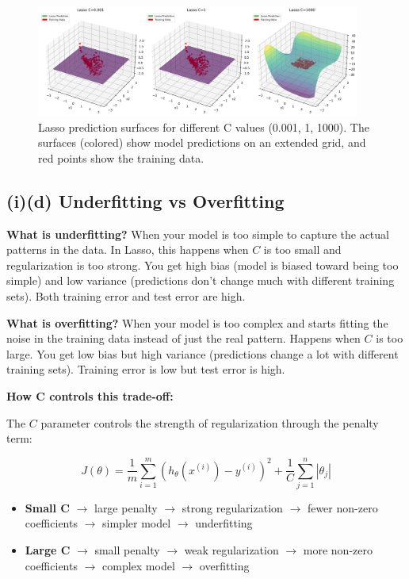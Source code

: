 \documentclass[11pt,a4paper]{article}
\begin{document}
\begin{figure}[H]
\centering
\includegraphics[width=0.95\textwidth]{figures/03_lasso_prediction_surfaces.png}
\caption{Lasso prediction surfaces for different C values (0.001, 1, 1000). The surfaces (colored) show model predictions on an extended grid, and red points show the training data.}
\label{fig:lasso_surfaces}
\end{figure}

\subsection*{(i)(d) Underfitting vs Overfitting}

\textbf{What is underfitting?} When your model is too simple to capture the actual patterns in the data. In Lasso, this happens when $C$ is too small and regularization is too strong. You get high bias (model is biased toward being too simple) and low variance (predictions don't change much with different training sets). Both training error and test error are high.

\textbf{What is overfitting?} When your model is too complex and starts fitting the noise in the training data instead of just the real pattern. Happens when $C$ is too large. You get low bias but high variance (predictions change a lot with different training sets). Training error is low but test error is high.

\textbf{How C controls this trade-off:}

The $C$ parameter controls the strength of regularization through the penalty term:

\begin{equation}
J(\theta) = \frac{1}{m} \sum_{i=1}^{m} (h_\theta(x^{(i)}) - y^{(i)})^2 + \frac{1}{C} \sum_{j=1}^{n} |\theta_j|
\end{equation}

\begin{itemize}
    \item \textbf{Small C} $\rightarrow$ large penalty $\rightarrow$ strong regularization $\rightarrow$ fewer non-zero coefficients $\rightarrow$ simpler model $\rightarrow$ underfitting
    \item \textbf{Large C} $\rightarrow$ small penalty $\rightarrow$ weak regularization $\rightarrow$ more non-zero coefficients $\rightarrow$ complex model $\rightarrow$ overfitting
\end{itemize}
\end{document}
